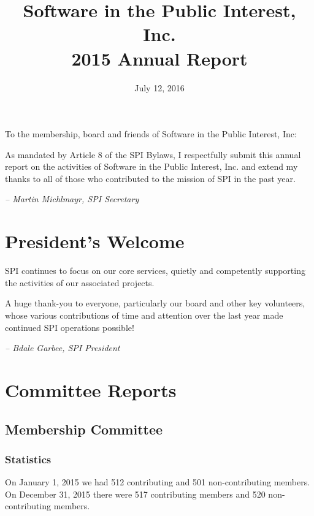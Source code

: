 \documentclass[letterpaper]{report}
\begin{document}
\title{Software in the Public Interest, Inc.\\
2015 Annual Report}
\date{July 12, 2016}

\maketitle

To the membership, board and friends of Software in the Public Interest, Inc:

As mandated by Article 8 of the SPI Bylaws, I respectfully submit this annual
report on the activities of Software in the Public Interest, Inc. and extend my
thanks to all of those who contributed to the mission of SPI in the past year.

  \emph{-- Martin Michlmayr, SPI Secretary}

\newpage

\tableofcontents

\newpage

\chapter{President's Welcome}
\label{sec:president}

SPI continues to focus on our core services, quietly and competently
supporting the activities of our associated projects.

A huge thank-you to everyone, particularly our board and other key
volunteers, whose various contributions of time and attention over the last
year made continued SPI operations possible!

  \emph{-- Bdale Garbee, SPI President}

\chapter{Committee Reports}
\section{Membership Committee}

\subsection{Statistics}

On January 1, 2015 we had 512 contributing and 501 non-contributing members.
On December 31, 2015 there were 517 contributing members and 520 non-contributing
members.
\end{document}
